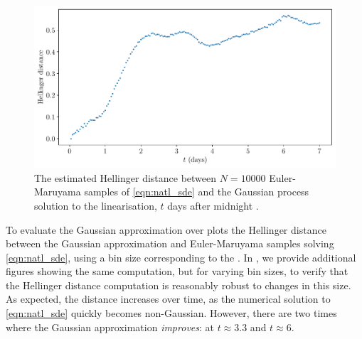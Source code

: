 \begin{figure}
	\begin{center}
		\includegraphics[width=\textwidth]{chp06_applications/figures/gulf_stream/traj_stoch_hell_dist_0.25}
		\caption{The estimated Hellinger distance between \(N = 10000\) Euler-Maruyama samples of \cref{eqn:natl_sde} and the Gaussian process solution to the linearisation, \(t\) days after midnight .}
		\label{fig:natl_hell}
	\end{center}
\end{figure}

To evaluate the Gaussian approximation over
 plots the Hellinger distance between the Gaussian approximation and Euler-Maruyama samples solving \eqref{eqn:natl_sde}, using a bin size corresponding to the .
In , we provide additional figures showing the same computation, but for varying bin sizes, to verify that the Hellinger distance computation is reasonably robust to changes in this size.
As expected, the distance increases over time, as the numerical solution to \eqref{eqn:natl_sde} quickly becomes non-Gaussian.
However, there are two times where the Gaussian approximation \emph{improves}: at \(t \approx 3.3\) and \(t \approx 6\).



